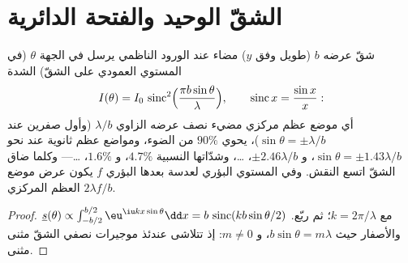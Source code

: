 \section{الشقّ الوحيد والفتحة الدائرية}

\begin{proposition}\label{prop:b2:diffraction:slit}
شقّ عرضه $b$ (طويل وفق $y$) مضاء عند الورود الناظمي يرسل في
الجهة $\theta$ (في المستوي العمودي على الشقّ)
الشدة
\[
I(\theta) = I_0\,\operatorname{sinc}^2\Bigl(\frac{\pi b\sin\theta}\lambda\Bigr) , \qquad \operatorname{sinc}x = \frac{\sin x}x :
\]
أي موضع عظم مركزي مضيء نصف عرضه الزاوي $\lambda/b$ (وأول صفرين عند
$\sin\theta = \pm\lambda/b$)، يحوي $90\%$ من الضوء، ومواضع عظم ثانوية
عند نحو $\sin\theta = \pm1.43\lambda/b$، و $\pm2.46\lambda/b$، \dots، وشدّاتها
النسبية $4.7\%$، و $1.6\%$، \dots --- وكلما ضاق الشقّ اتسع
النقش. وفي المستوي البؤري لعدسة بعدها البؤري $f$ يكون
عرض موضع العظم المركزي $2\lambda f/b$.
\end{proposition}

\begin{proof}
$\underline s(\theta) \propto \int_{-b/2}^{b/2}\eu^{\iu kx\sin\theta}\dd x = b\,\operatorname{sinc}(kb\sin\theta/2)$
مع $k = 2\pi/\lambda$؛ ثم ربّع. والأصفار حيث $b\sin\theta = m\lambda$، و $m \ne 0$: إذ
تتلاشى عندئذ موجيرات نصفي الشقّ مثنى مثنى.
\end{proof}

